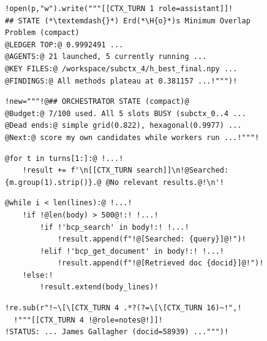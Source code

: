 \begin{figure}[t]
\centering

\begin{minipage}[t]{\clmactcolw}
\begin{lstlisting}[style=clmactstyle]
!open(p,"w").write("""[[CTX_TURN 1 role=assistant]]!
## STATE (*\textemdash{}*) Erd(*\H{o}*)s Minimum Overlap Problem (compact)
@LEDGER TOP:@ 0.9992491 ...
@AGENTS:@ 21 launched, 5 currently running ...
@KEY FILES:@ /workspace/subctx_4/h_best_final.npy ...
@FINDINGS:@ All methods plateau at 0.381157 ...!""")!
\end{lstlisting}
\begin{lstlisting}[style=clmactstyle]
!new="""!@## ORCHESTRATOR STATE (compact)@
@Budget:@ 7/100 used. All 5 slots BUSY (subctx_0..4 ...
@Dead ends:@ simple grid(0.822), hexagonal(0.9977) ...
@Next:@ score my own candidates while workers run ...!"""!
\end{lstlisting}

\vspace{4pt}

\begin{lstlisting}[style=clmactstyle]
@for t in turns[1:]:@ !...!
    !result += f'\n[[CTX_TURN search]]\n!@Searched: {m.group(1).strip()}.@ @No relevant results.@!\n'!
\end{lstlisting}
\begin{lstlisting}[style=clmactstyle]
@while i < len(lines):@ !...!
    !if !@len(body) > 500@!:! !...!
        !if !'bcp_search' in body!:! !...!
            !result.append(f"!@[Searched: {query}]@!")!
        !elif !'bcp_get_document' in body!:! !...!
            !result.append(f"!@[Retrieved doc {docid}]@!")!
    !else:!
        !result.extend(body_lines)!
\end{lstlisting}
\end{minipage}
\hfill
\begin{minipage}[t]{\clmactcolw}
\begin{lstlisting}[style=clmactstyle]
!re.sub(r"!~\[\[CTX_TURN 4 .*?(?=\[\[CTX_TURN 16)~!",!
  !"""[[CTX_TURN 4 !@role=notes@!]]!
!STATUS: ... James Gallagher (docid=58939) ...""")!
\end{lstlisting}


\end{minipage}
\end{figure}
